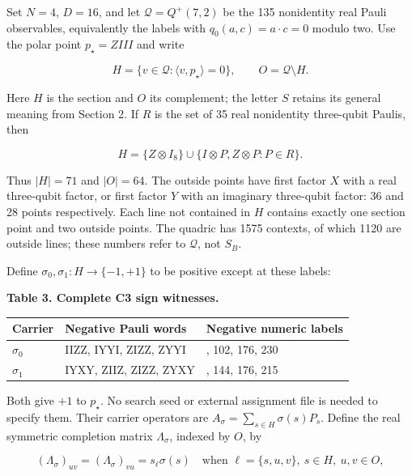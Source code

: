\documentclass[11pt,a4paper]{article}
\begin{document}
Set \(N=4\), \(D=16\), and let \(\mathcal Q=Q^+(7,2)\) be the 135 nonidentity real Pauli observables,
equivalently the labels with \(q_0(a,c)=a\cdot c=0\) modulo two. Use the polar point \(p_\star=ZIII\) and
write

\[H=\{v\in\mathcal Q:\langle v,p_\star\rangle=0\},\qquad
O=\mathcal Q\setminus H.\]

Here \(H\) is the section and \(O\) its complement; the letter \(S\) retains its general meaning from
Section 2. If \(R\) is the set of 35 real nonidentity three-qubit Paulis, then

\[H=\{Z\otimes I_8\}\cup\{I\otimes P,Z\otimes P:P\in R\}.\]

Thus \(|H|=71\) and \(|O|=64\). The outside points have first factor \(X\) with a real three-qubit factor,
or first factor \(Y\) with an imaginary three-qubit factor: 36 and 28 points respectively. Each line
not contained in \(H\) contains exactly one section point and two outside points. The quadric has
1575 contexts, of which 1120 are outside lines; these numbers refer to \(\mathcal Q\), not \(S_B\).

Define \(\sigma_0,\sigma_1:H\to\{-1,+1\}\) to be positive except at these labels:

\textbf{Table 3. Complete C3 sign witnesses.}

{\def\LTcaptype{none} %
{\small
\begin{longtable}[]{@{}>{\raggedright\arraybackslash}p{}>{\raggedright\arraybackslash}p{}>{\raggedright\arraybackslash}p{}@{}}
\toprule\noalign{}
Carrier & Negative Pauli words & Negative numeric labels \\
\midrule\noalign{}
\endhead
\bottomrule\noalign{}
\endlastfoot
\(\sigma_0\) & IIZZ, IYYI, ZIZZ, ZYYI & 48, 102, 176, 230 \\
\(\sigma_1\) & IYXY, ZIIZ, ZIZZ, ZYXY & 87, 144, 176, 215 \\
\end{longtable}
}
}

Both give \(+1\) to \(p_\star\). No search seed or external assignment file is needed to specify them.
Their carrier operators are \(A_\sigma=\sum_{s\in H}\sigma(s)P_s\). Define the real symmetric
completion matrix \(\Lambda_\sigma\), indexed by \(O\), by

\[(\Lambda_\sigma)_{uv}=(\Lambda_\sigma)_{vu}=s_\ell\sigma(s)
\quad\text{when }\ell=\{s,u,v\},\ s\in H,\ u,v\in O,\]
\end{document}
